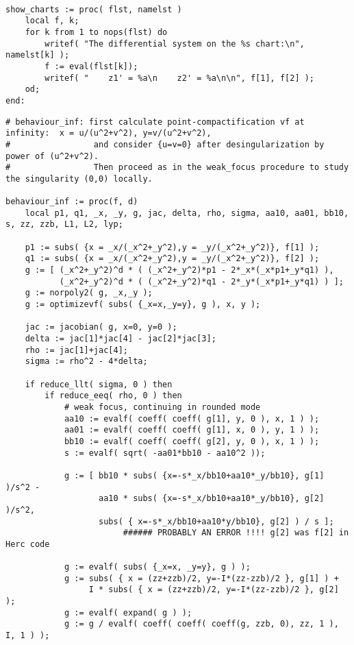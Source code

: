 \documentclass[a4paper,10pt]{article}
\begin{document}
\begin{lstlisting}[name=infinity]

show_charts := proc( flst, namelst )
    local f, k;
    for k from 1 to nops(flst) do
        writef( "The differential system on the %s chart:\n", namelst[k] );
        f := eval(flst[k]);
        writef( "    z1' = %a\n    z2' = %a\n\n", f[1], f[2] );
    od;
end:
\end{lstlisting}


\begin{lstlisting}[name=infinity]
# behaviour_inf: first calculate point-compactification vf at infinity:  x = u/(u^2+v^2), y=v/(u^2+v^2),
#                 and consider {u=v=0} after desingularization by power of (u^2+v^2).
#                 Then proceed as in the weak_focus procedure to study the singularity (0,0) locally.

behaviour_inf := proc(f, d)
    local p1, q1, _x, _y, g, jac, delta, rho, sigma, aa10, aa01, bb10, s, zz, zzb, L1, L2, lyp;

    p1 := subs( {x = _x/(_x^2+_y^2),y = _y/(_x^2+_y^2)}, f[1] );
    q1 := subs( {x = _x/(_x^2+_y^2),y = _y/(_x^2+_y^2)}, f[2] );
    g := [ (_x^2+_y^2)^d * ( (_x^2+_y^2)*p1 - 2*_x*(_x*p1+_y*q1) ),
           (_x^2+_y^2)^d * ( (_x^2+_y^2)*q1 - 2*_y*(_x*p1+_y*q1) ) ];
    g := norpoly2( g, _x,_y );
    g := optimizevf( subs( {_x=x,_y=y}, g ), x, y );

    jac := jacobian( g, x=0, y=0 );
    delta := jac[1]*jac[4] - jac[2]*jac[3];
    rho := jac[1]+jac[4];
    sigma := rho^2 - 4*delta;

    if reduce_llt( sigma, 0 ) then
        if reduce_eeq( rho, 0 ) then
            # weak focus, continuing in rounded mode
            aa10 := evalf( coeff( coeff( g[1], y, 0 ), x, 1 ) );
            aa01 := evalf( coeff( coeff( g[1], x, 0 ), y, 1 ) );
            bb10 := evalf( coeff( coeff( g[2], y, 0 ), x, 1 ) );
            s := evalf( sqrt( -aa01*bb10 - aa10^2 ));

            g := [ bb10 * subs( {x=-s*_x/bb10+aa10*_y/bb10}, g[1] )/s^2 -
                   aa10 * subs( {x=-s*_x/bb10+aa10*_y/bb10}, g[2] )/s^2,
                   subs( { x=-s*_x/bb10+aa10*y/bb10}, g[2] ) / s ];
                        ###### PROBABLY AN ERROR !!!! g[2] was f[2] in Herc code

            g := evalf( subs( {_x=x, _y=y}, g ) );
            g := subs( { x = (zz+zzb)/2, y=-I*(zz-zzb)/2 }, g[1] ) +
                 I * subs( { x = (zz+zzb)/2, y=-I*(zz-zzb)/2 }, g[2] );
            g := evalf( expand( g ) );
            g := g / evalf( coeff( coeff( coeff(g, zzb, 0), zz, 1 ), I, 1 ) );


\end{lstlisting}
\end{document}
